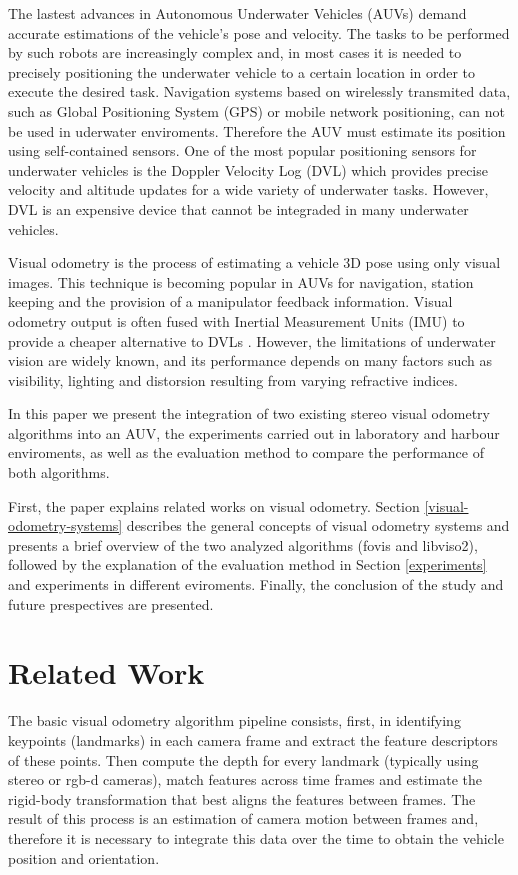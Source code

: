 \documentclass[conference]{IEEEtran}
\begin{document}
The lastest advances in Autonomous Underwater Vehicles (AUVs) demand accurate estimations of the vehicle's pose and velocity. The tasks to be performed by such robots are increasingly complex and, in most cases it is needed to precisely positioning the underwater vehicle to a certain location in order to execute the desired task. Navigation systems based on wirelessly transmited data, such as Global Positioning System (GPS) or mobile network positioning, can not be used in uderwater enviroments. Therefore the AUV must estimate its position using self-contained sensors. One of the most popular positioning sensors for underwater vehicles is the Doppler Velocity Log (DVL) which provides precise velocity and altitude updates for a wide variety of underwater tasks. However, DVL is an expensive device that cannot be integraded in many underwater vehicles.

Visual odometry is the process of estimating a vehicle 3D pose using only visual images. This technique is becoming popular in AUVs for navigation, station keeping and the provision of a manipulator feedback information. Visual odometry output is often fused with Inertial Measurement Units (IMU) to provide a cheaper alternative to DVLs \cite{Hildebrandt2010} \cite{Dunbabin2004}. However, the limitations of underwater vision are widely known, and its performance depends on many factors such as visibility, lighting and distorsion resulting from varying refractive indices.

In this paper we present the integration of two existing stereo visual odometry algorithms into an AUV, the experiments carried out in laboratory and harbour enviroments, as well as the evaluation method to compare the performance of both algorithms.

First, the paper explains related works on visual odometry. Section \ref{visual-odometry-systems} describes the general concepts of visual odometry systems and presents a brief overview of the two analyzed algorithms (fovis and libviso2), followed by the explanation of the evaluation method in Section \ref{experiments} and experiments in different eviroments. Finally, the conclusion of the study and future prespectives are presented.

\section{Related Work 
  \label{related-work}
}

The basic visual odometry algorithm pipeline \cite{Moravec1980} consists, first, in identifying keypoints (landmarks) in each camera frame and extract the feature descriptors of these points. Then compute the depth for every landmark (typically using stereo or rgb-d cameras), match features across time frames and estimate the rigid-body transformation that best aligns the features between frames. The result of this process is an estimation of  camera motion between frames and, therefore it is necessary to integrate this data over the time to obtain the vehicle position and orientation.
\end{document}
